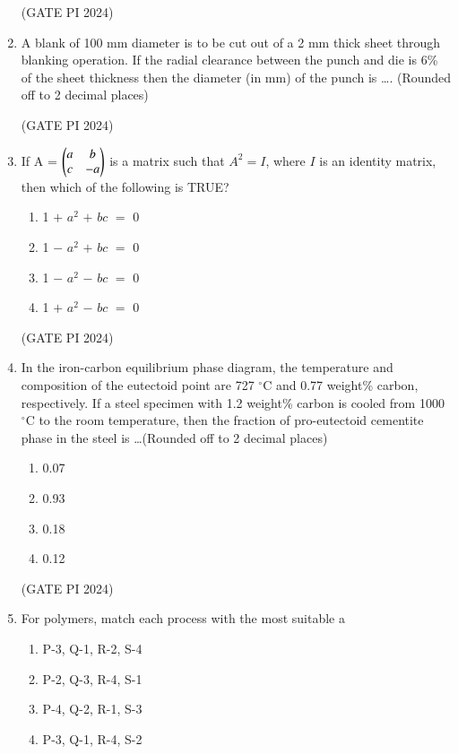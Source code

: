 \documentclass[journal,12pt,onecolumn]{IEEEtran}
\theoremstyle{remark}
\begin{document}
\begin{enumerate}
\hfill (GATE PI 2024)

\item A blank of 100 mm diameter is to be cut out of a 2 mm thick sheet through blanking operation. If the radial clearance between the punch and die is 6\% of the sheet thickness then the diameter (in mm) of the punch is \dots . (Rounded off to 2 decimal places)

\hfill (GATE PI 2024)

\item If A =
$
\begin{pmatrix}
a & b \\
c & -a 
\end{pmatrix} 
$
is a matrix such that $A^2=I$, where $I$ is an identity matrix, then which of the following is TRUE?

\begin{enumerate}
    \item 1 $+$ $a^2$ $+$ $bc$ $=$ 0
    \item 1 $-$ $a^2$ $+$ $bc$ $=$ 0
    \item 1 $-$ $a^2$ $-$ $bc$ $=$ 0
    \item 1 $+$ $a^2$ $-$ $bc$ $=$ 0
\end{enumerate}

\hfill (GATE PI 2024)

\item In the iron-carbon equilibrium phase diagram, the temperature and composition of the eutectoid point are 727 $^\circ$C and 0.77 weight\% carbon, respectively. If a steel specimen with 1.2 weight\% carbon is cooled from 1000 $^\circ$C to the room temperature, then the fraction of pro-eutectoid cementite phase in the steel is \dots (Rounded off to 2 decimal places)

\begin{multicols}{4}
\begin{enumerate}
    \item 0.07
    \item 0.93
    \item 0.18
    \item 0.12
\end{enumerate}
\end{multicols}

\hfill (GATE PI 2024)

\item For polymers, match each process with the most suitable a



\begin{enumerate}
\item P-3, Q-1, R-2, S-4
\item P-2, Q-3, R-4, S-1
\item P-4, Q-2, R-1, S-3
\item P-3, Q-1, R-4, S-2
\end{enumerate}


\end{enumerate}
\end{document}
